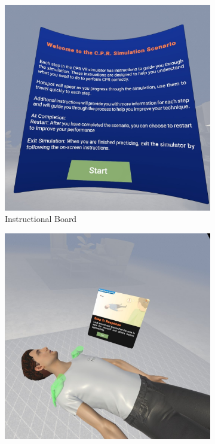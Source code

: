 \documentclass[manuscript]{./Models/acmart}
\begin{document}
 \begin{figure}[h]
    \centering
    \begin{subfigure}[b]{0.24\textwidth}
        \centering
        \includegraphics[width=\textwidth]{Photos/VR1.jpeg}
        \caption{Instructional Board}
        \label{fig:VR1}
    \end{subfigure}
    \hfill
    \begin{subfigure}[b]{0.24\textwidth}
        \centering
        \includegraphics[width=\textwidth]{Photos/VR2.jpeg}

\end{subfigure}
\end{figure}
\end{document}
